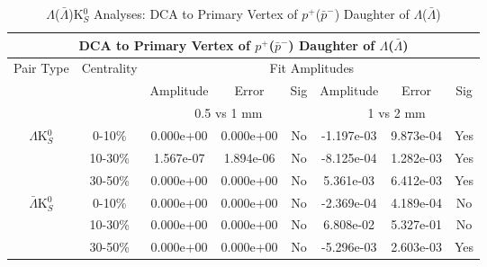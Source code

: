 \documentclass[../AnalysisNoteJBuxton.tex]{subfiles}
\begin{document}
\begin{table}
 \centering
 \begin{tabular}{|c|c|c|c|c||c|c|c|}
  \multicolumn{8}{c}{DCA to Primary Vertex of $p^{+}$($\bar{p}^{-}$) Daughter of $\Lambda$($\bar{\Lambda}$)} \\
  \hline
  \multirow{3}{*}{Pair Type} & \multirow{3}{*}{Centrality} & \multicolumn{6}{c|}{Fit Amplitudes} \\
  \cline{3-8}
   & & Amplitude & Error & Sig & Amplitude & Error & Sig \\  
  \cline{3-8}
   & & \multicolumn{3}{c||}{0.5 vs 1 mm} & \multicolumn{3}{c|}{1 vs 2 mm} \\  
  \hline  
  \multirow{3}{*}{$\Lambda$K$^{0}_{S}$}  
   &  0-10\% & 0.000e+00 & 0.000e+00 & No & -1.197e-03 & 9.873e-04 & Yes \\
   & 10-30\% & 1.567e-07 & 1.894e-06 & No & -8.125e-04 & 1.282e-03 & Yes \\
   & 30-50\% & 0.000e+00 & 0.000e+00 & No & 5.361e-03 & 6.412e-03 & Yes \\
  \hline  
  \multirow{3}{*}{$\bar{\Lambda}$K$^{0}_{S}$}  
   &  0-10\% & 0.000e+00 & 0.000e+00 & No & -2.369e-04 & 4.189e-04 & No \\
   & 10-30\% & 0.000e+00 & 0.000e+00 & No & 6.808e-02 & 5.327e-01 & No \\
   & 30-50\% & 0.000e+00 & 0.000e+00 & No & -5.296e-03 & 2.603e-03 & Yes \\
  \hline
 \end{tabular}
 \caption{$\Lambda$($\bar{\Lambda}$)K$^{0}_{S}$ Analyses: DCA to Primary Vertex of $p^{+}$($\bar{p}^{-}$) Daughter of $\Lambda$($\bar{\Lambda}$)}
 \label{tab:DcaToPrimVertexProtonDaughtOfLamLamK0}
\end{table}
\end{document}
